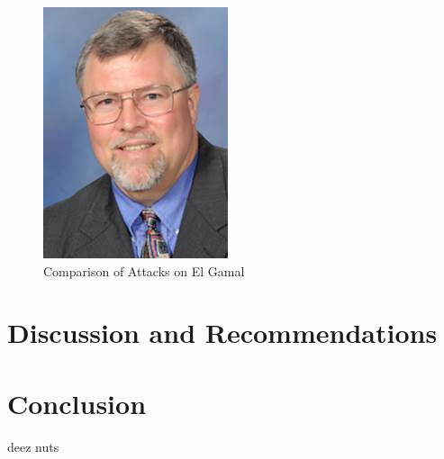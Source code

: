 \documentclass[12pt]{report}
\begin{document}
\begin{figure}[hp!] %
    \begin{center}
        \includegraphics[width=0.5\linewidth]{walker.jpg}
        \caption{Comparison of Attacks on El Gamal}
        \label{fig:el-gamal}
    \end{center}
\end{figure}

\section{Discussion and Recommendations}

\section{Conclusion}
deez nuts

\newpage
\end{document}
